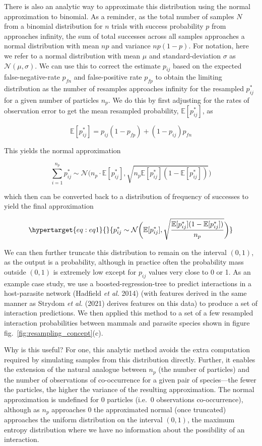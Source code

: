 \documentclass[10pt,oneside]{article}
\begin{document}
There is also an analytic way to approximate this distribution using the
normal approximation to binomial. As a reminder, as the total number of
samples \(N\) from a binomial distribution for \(n\) trials with success
probability \(p\) from approaches infinity, the sum of total successes
across all samples approaches a normal distribution with mean \(np\) and
variance \(np(1-p)\). For notation, here we refer to a normal
distribution with mean \(\mu\) and standard-deviation \(\sigma\) as
\(\mathcal{N}(\mu,\sigma)\). We can use this to correct the estimate
\(p_{ij}\) based on the expected false-negative-rate \(p_{fn}\) and
false-positive rate \(p_{fp}\) to obtain the limiting distribution as
the number of resamples approaches infinity for the resampled
\(p_{ij}^*\) for a given number of particles \(n_p\). We do this by
first adjusting for the rates of observation error to get the mean
resampled probability, \(\mathbb{E}[{p_{ij}^*}]\), as

\[
\mathbb{E}[{p_{ij}^*}] = p_{ij}(1-p_{fp})+ (1-p_{ij})p_{fn}
\]

This yields the normal approximation

\[
\sum_{i=1}^{n_p} p_{ij}^* \sim \mathcal{N}\bigg(n_p \cdot \mathbb{E}[p_{ij}^*], \sqrt{n_p\mathbb{E}[p_{ij}^*] (1- \mathbb{E}[p_{ij}^*])}\bigg)
\]

which then can be converted back to a distribution of frequency of
successes to yield the final approximation

\begin{equation}\protect\hypertarget{eq:eq1}{}{p_{ij}^* \sim \mathcal{N}\bigg( \mathbb{E}[p_{ij}^*] , \sqrt{\frac{\mathbb{E}[p_{ij}^*]
(1-\mathbb{E}[p_{ij}^*] )}{n_p}} \bigg)}\label{eq:eq1}\end{equation}

We can then further truncate this distribution to remain on the interval
\((0,1)\), as the output is a probability, although in practice often
the probability mass outside \((0,1)\) is extremely low except for
\(p_{ij}\) values very close to 0 or 1. As an example case study, we use
a boosted-regression-tree to predict interactions in a host-parasite
network (Hadfield \emph{et al.} 2014) (with features derived in the same
manner as Strydom \emph{et al.} (2021) derives features on this data) to
produce a set of interaction predictions. We then applied this method to
a set of a few resampled interaction probabilities between mammals and
parasite species shown in figure fig.~\ref{fig:resampling_concept}(c).

Why is this useful? For one, this analytic method avoids the extra
computation required by simulating samples from this distribution
directly. Further, it enables the extension of the natural analogue
between \(n_p\) (the number of particles) and the number of observations
of co-occurrence for a given pair of species---the fewer the particles,
the higher the variance of the resulting approximation. The normal
approximation is undefined for 0 particles (i.e.~0 observations
co-occurrence), although as \(n_p\) approaches 0 the approximated normal
(once truncated) approaches the uniform distribution on the interval
\((0,1)\), the maximum entropy distribution where we have no information
about the possibility of an interaction.
\end{document}
